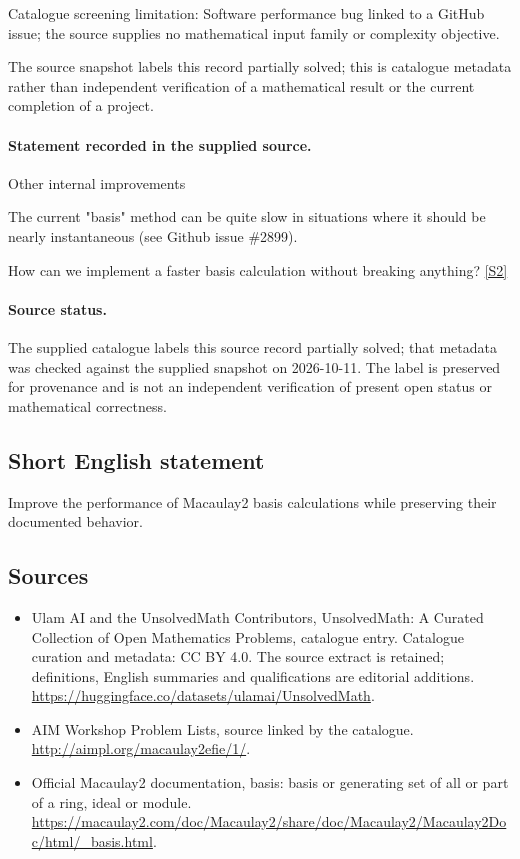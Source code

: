 \documentclass[11pt]{article}
\begin{document}
Catalogue screening limitation: Software performance bug linked to a GitHub issue; the source supplies no mathematical input family or complexity objective.

The source snapshot labels this record partially solved; this is catalogue metadata rather than independent verification of a mathematical result or the current completion of a project.
\paragraph{Statement recorded in the supplied source.}
Other internal improvements

The current "basis" method can be quite slow in situations where it should be nearly instantaneous (see Github issue \#2899).

How can we implement a faster basis calculation without breaking anything? \href{http://aimpl.org/macaulay2efie/1/}{[S2]}
\paragraph{Source status.}
The supplied catalogue labels this source record partially solved; that metadata was checked against the supplied snapshot on 2026-10-11. The label is preserved for provenance and is not an independent verification of present open status or mathematical correctness.
\subsection{Short English statement}
Improve the performance of Macaulay2 basis calculations while preserving their documented behavior.
\subsection{Sources}
\begin{itemize}
\item[S1] Ulam AI and the UnsolvedMath Contributors, UnsolvedMath: A Curated Collection of Open Mathematics Problems, catalogue entry. Catalogue curation and metadata: CC BY 4.0. The source extract is retained; definitions, English summaries and qualifications are editorial additions.
\url{https://huggingface.co/datasets/ulamai/UnsolvedMath}.
\item[S2] AIM Workshop Problem Lists, source linked by the catalogue.
\url{http://aimpl.org/macaulay2efie/1/}.
\item[S3] Official Macaulay2 documentation, basis: basis or generating set of all or part of a ring, ideal or module.
\url{https://macaulay2.com/doc/Macaulay2/share/doc/Macaulay2/Macaulay2Doc/html/_basis.html}.
\end{itemize}
\end{document}
